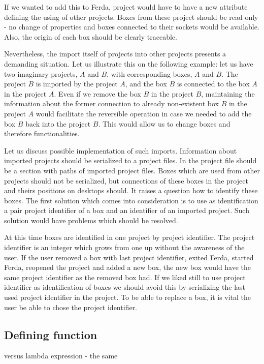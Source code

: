 \documentclass[a4paper,12pt]{book}
\begin{document}
If we wanted to add this to Ferda, project would have to have a new attribute defining the using of other projects. Boxes from these project should be read only - no change of properties and boxes connected to their sockets would be available. Also, the origin of each box should be clearly traceable.

Nevertheless, the import itself of projects into other projects presents a demanding situation. Let us illustrate this on the following example: let us have two imaginary projects, $A$ and $B$, with corresponding boxes, $A$ and $B$. The project $B$ is imported by the project $A$, and the box $B$ is connected to the box $A$ in the project $A$. Even if we remove the box $B$ in the project $B$, maintaining the information about the former connection to already non-existent box $B$ in the project $A$ would facilitate the reversible operation in case we needed to add the box $B$ back into the project $B$. This would allow us to change boxes and therefore functionalities.

Let us discuss possible implementation of such imports. Information about imported projects should be serialized to a project files. In the project file should be a section with paths of imported project files. Boxes which are used from other projects should not be serialized, but connections of these boxes in the project and theirs positions on desktops should. It raises a question how to identify these boxes. The first solution which comes into consideration is to use as identification a pair project identifier of a box and an identifier of an imported project. Such solution would have problems which should be resolved.

At this time boxes are identified in one project by project identifier. The project identifier is an integer which grows from one up without the awareness of the user. If the user removed a box with last project identifier, exited Ferda, started Ferda, reopened the project and added a new box, the new box would have the same project identifier as the removed box had. If we liked still to use project identifier as identification of boxes we should avoid this by serializing the last used project identifier in the project. To be able to replace a box, it is vital the user be able to chose the project identifier.

\subsection{Defining function}
versus lambda expression - the same
\end{document}
